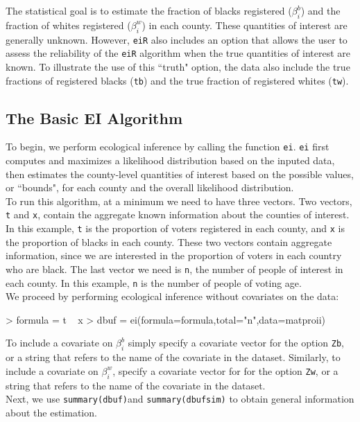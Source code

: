 \documentclass[11pt,oneside,letterpaper,titlepage]{article}
\begin{document}
\noindent The statistical goal is to estimate the fraction of blacks registered ($\beta_i^b$) and the fraction of whites registered ($\beta_i^w$) in each county. These quantities of interest are generally unknown.  However, \verb#eiR# also includes an option that allows the user to assess the reliability of the \verb#eiR# algorithm when the true quantities of interest are known. To illustrate the use of this ``truth" option, the data also include the true fractions of registered blacks (\verb#tb#) and the true fraction of registered whites (\verb#tw#). 

\subsection{The Basic EI Algorithm}

To begin, we perform ecological inference by calling the function
\verb#ei#. \verb#ei# first computes and maximizes a likelihood
distribution based on the inputed data, then estimates the county-level
quantities of interest based on the possible values, or ``bounds", for
each county and the overall likelihood distribution.  \\ \newline To
run this algorithm, at a minimum we need to have three vectors.  Two
vectors, \verb#t# and \verb#x#, contain the aggregate known
information about the counties of interest.  In this example, \verb#t#
is the proportion of voters registered in each county, and \verb#x# is
the proportion of blacks in each county.  These two vectors contain
aggregate information, since we are interested in the proportion of
voters in each country who are black.  The last vector we need is
\verb#n#, the number of people of interest in each county.  In this
example, \verb#n# is the number of people of voting age.\\ \newline We
proceed by performing ecological inference without covariates on the
data:

\begin{Schunk}
\begin{Sinput}
> formula = t ~ x
> dbuf = ei(formula=formula,total="n",data=matproii)
\end{Sinput}
\end{Schunk}

\noindent To include a covariate on $\beta_i^b$ simply specify a covariate vector for the option \verb#Zb#, or a string that refers to the name of the covariate in the dataset.  Similarly, to include a covariate on $\beta_i^w$, specify a covariate vector for for the option \verb#Zw#, or a string that refers to the name of the covariate in the dataset.\\
\newline
Next, we use \verb#summary(dbuf)#and \verb#summary(dbufsim)# to obtain general information about the estimation. 
\end{document}
